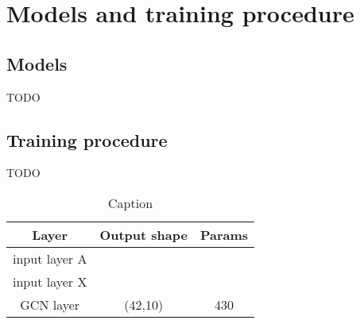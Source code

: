 \chapter{Models and training procedure}
\label{app:model_training}
\section{Models}
TODO
\section{Training procedure}
TODO
\begin{table}[]
    \centering
    \begin{tabular}{c|c|c}
         Layer & Output shape & Params\\ \hline
         input layer A & &  \\
         input layer X & &  \\
         GCN layer & (42,10) & 430 \\
    \end{tabular}
    \caption{Caption}
    \label{tab:my_label}
\end{table}


